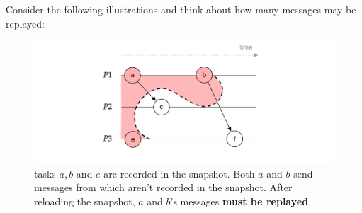 \noindent
Consider the following illustrations and think about how many messages may be replayed:

\begin{figure}[h]
    \centering
    \includegraphics[width=1\textwidth]{Sections/snap/snap_2.png}
    \caption{tasks $a,b$ and $e$ are recorded in the snapshot. Both $a$ and $b$ send messages from which aren't recorded in the snapshot. After 
    reloading the snapshot, $a$ and $b$'s messages \textbf{must be replayed}.}
\end{figure}
